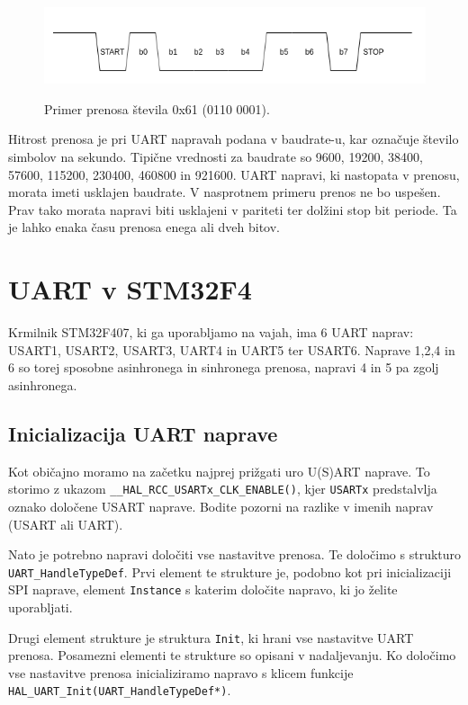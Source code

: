 \documentclass[12pt,letterpaper]{article}
\begin{document}
\begin{figure}[ht!]
  \centering
  \caption{Primer prenosa števila 0x61 (0110 0001).}
  \includegraphics[width=320pt]{images/vaja8/asinhron_prenos.png}
  \label{asinhronprenos}
\end{figure}

Hitrost prenosa je pri UART napravah podana v baudrate-u, kar označuje število simbolov na sekundo. Tipične vrednosti za baudrate so 9600, 19200, 38400, 57600, 115200, 230400, 460800 in 921600. UART napravi, ki nastopata v prenosu, morata imeti usklajen baudrate. V nasprotnem primeru prenos ne bo uspešen. Prav tako morata napravi biti usklajeni v pariteti ter dolžini stop bit periode. Ta je lahko enaka času prenosa enega ali dveh bitov.


\section*{UART v STM32F4}

Krmilnik STM32F407, ki ga uporabljamo na vajah, ima 6 UART naprav: USART1, USART2, USART3, UART4 in UART5 ter USART6. Naprave 1,2,4 in 6 so torej sposobne asinhronega in sinhronega prenosa, napravi 4 in 5 pa zgolj asinhronega.

\subsection*{Inicializacija UART naprave}

Kot običajno moramo na začetku najprej prižgati uro U(S)ART naprave. To storimo z ukazom \texttt{\_\_HAL\_RCC\_USARTx\_CLK\_ENABLE()}, kjer \texttt{USARTx} predstalvlja oznako določene USART naprave. Bodite pozorni na razlike v imenih naprav (USART ali UART).

Nato je potrebno napravi določiti vse nastavitve prenosa. Te določimo s strukturo \texttt{UART\_HandleTypeDef}. Prvi element te strukture je, podobno kot pri inicializaciji SPI naprave, element \texttt{Instance} s katerim določite napravo, ki jo želite uporabljati. 

Drugi element strukture je struktura \texttt{Init}, ki hrani vse nastavitve UART prenosa. Posamezni elementi te strukture so opisani v nadaljevanju. Ko določimo vse nastavitve prenosa inicializiramo napravo s klicem funkcije \texttt{HAL\_UART\_Init(UART\_HandleTypeDef*)}.
\end{document}
